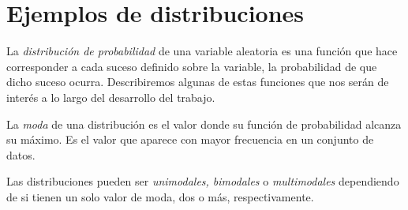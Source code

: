 \documentclass[oneside,openright,titlepage,numbers=noenddot,openany,headinclude,footinclude=true,
cleardoublepage=empty,abstractoff,BCOR=5mm,paper=a4,fontsize=12pt,main=spanish]{scrreprt}
\begin{document}
\section{Ejemplos de distribuciones}

La \textit{distribución de probabilidad} de una variable aleatoria es una función que hace corresponder a cada suceso definido sobre la variable, la probabilidad de que dicho suceso ocurra. Describiremos algunas de estas funciones que nos serán de interés a lo largo del desarrollo del trabajo.\\

\begin{definition}[Moda]
La \textit{moda} de una distribución es el valor donde su función de probabilidad alcanza su máximo. Es el valor que aparece con mayor frecuencia en un conjunto de datos.
\end{definition}

\clearpage

Las distribuciones pueden ser \textit{unimodales, bimodales} o \textit{multimodales} dependiendo de si tienen un solo valor de moda, dos o más, respectivamente.\\
\end{document}

